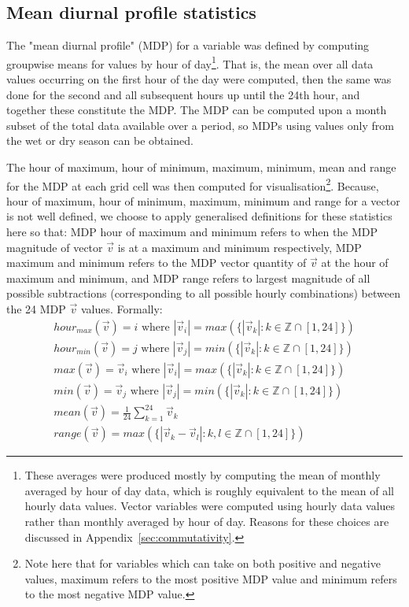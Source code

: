 \subsection{Mean diurnal profile statistics}
\label{ssec:method_mdp}

The "mean diurnal profile" (\ac{MDP}) for a variable was defined by computing groupwise means for values by hour of day\footnote{These averages were produced mostly by computing the mean of monthly averaged by hour of day data, which is roughly equivalent to the mean of all hourly data values. Vector variables were computed using hourly data values rather than monthly averaged by hour of day. Reasons for these choices are discussed in Appendix~\ref{sec:commutativity}.}. That is, the mean over all data values occurring on the first hour of the day were computed, then the same was done for the second and all subsequent hours up until the 24th hour, and together these constitute the \ac{MDP}. The \ac{MDP} can be computed upon a month subset of the total data available over a period, so \ac{MDP}s using values only from the wet or dry season can be obtained. 

The hour of maximum, hour of minimum, maximum, minimum, mean and range for the \ac{MDP} at each grid cell was then computed for visualisation\footnote{Note here that for variables which can take on both positive and negative values, maximum refers to the most positive \ac{MDP} value and minimum refers to the most negative \ac{MDP} value.}. Because, hour of maximum, hour of minimum, maximum, minimum and range for a vector is not well defined, we choose to apply generalised definitions for these statistics here so that: \ac{MDP} hour of maximum and minimum refers to when the \ac{MDP} magnitude of vector $\vec{v}$ is at a maximum and minimum respectively, \ac{MDP} maximum and minimum refers to the \ac{MDP} vector quantity of $\vec{v}$ at the hour of maximum and minimum, and \ac{MDP} range refers to largest magnitude of all possible subtractions (corresponding to all possible hourly combinations) between the 24 \ac{MDP} $\vec{v}$ values. Formally:
\begin{eqnarray}
	hour_{max}(\vec{v}) = i \mbox{ where } |\vec{v}_i| = max( \{|\vec{v}_k| : k \in \mathbb{Z} \cap [1,24] \}) \\
	hour_{min}(\vec{v}) = j \mbox{ where } |\vec{v}_j| = min( \{|\vec{v}_k| : k \in \mathbb{Z} \cap [1,24] \}) \\
	max(\vec{v}) = \vec{v}_i \mbox{ where } |\vec{v}_i| = max( \{|\vec{v}_k| : k \in \mathbb{Z} \cap [1,24] \}) \\
	min(\vec{v}) = \vec{v}_j \mbox{ where } |\vec{v}_j| = min( \{|\vec{v}_k| : k \in \mathbb{Z} \cap [1,24] \}) \\
	mean(\vec{v}) = \frac{1}{24} \sum_{k=1}^{24} \vec{v}_k \\
	range(\vec{v}) = max(\{|\vec{v}_k - \vec{v}_l| : k,l \in \mathbb{Z} \cap [1,24] \})
\end{eqnarray}

